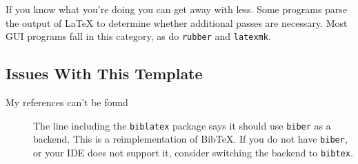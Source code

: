 \documentclass[{{cookiecutter.project_slug}}.tex]{subfiles}
\begin{document}
    If  you know  what  you're doing  you  can get  away  with less.   Some
    programs parse the  output of \LaTeX{} to  determine whether additional
    passes are necessary.  Most GUI programs fall in this category, as do
    \verb+rubber+ and \verb+latexmk+.

    \subsection{Issues With This Template}
    \begin{description}
        \item [My references can't be found] 
            The line including the \texttt{biblatex} package says it should
            use \texttt{biber} as a backend.  This is a reimplementation of
            BibTeX. If you do not have \texttt{biber}, or your IDE does not
            support it, consider switching the backend to \texttt{bibtex}.
    \end{description}
\end{document}
